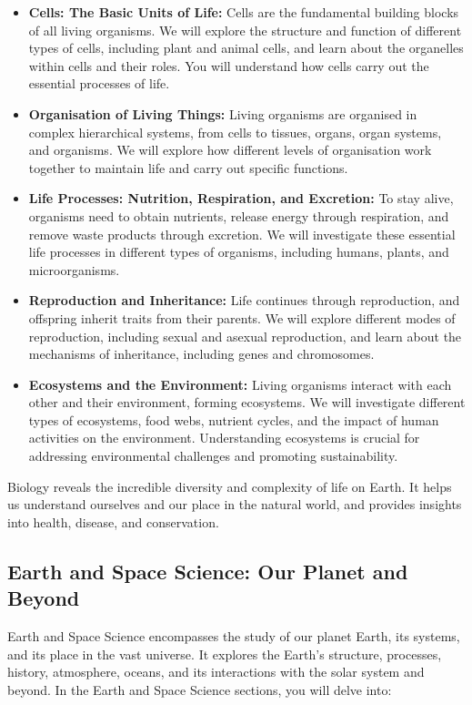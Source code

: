 \begin{itemize}
    \item \textbf{Cells: The Basic Units of Life:}  Cells are the fundamental building blocks of all living organisms.  We will explore the structure and function of different types of cells, including plant and animal cells, and learn about the organelles within cells and their roles.  You will understand how cells carry out the essential processes of life.
    \item \textbf{Organisation of Living Things:}  Living organisms are organised in complex hierarchical systems, from cells to tissues, organs, organ systems, and organisms.  We will explore how different levels of organisation work together to maintain life and carry out specific functions.
    \item \textbf{Life Processes: Nutrition, Respiration, and Excretion:}  To stay alive, organisms need to obtain nutrients, release energy through respiration, and remove waste products through excretion.  We will investigate these essential life processes in different types of organisms, including humans, plants, and microorganisms.
    \item \textbf{Reproduction and Inheritance:}  Life continues through reproduction, and offspring inherit traits from their parents.  We will explore different modes of reproduction, including sexual and asexual reproduction, and learn about the mechanisms of inheritance, including genes and chromosomes.
    \item \textbf{Ecosystems and the Environment:}  Living organisms interact with each other and their environment, forming ecosystems.  We will investigate different types of ecosystems, food webs, nutrient cycles, and the impact of human activities on the environment.  Understanding ecosystems is crucial for addressing environmental challenges and promoting sustainability.
\end{itemize}

Biology reveals the incredible diversity and complexity of life on Earth.  It helps us understand ourselves and our place in the natural world, and provides insights into health, disease, and conservation.

\FloatBarrier

\subsection{Earth and Space Science:  Our Planet and Beyond}

Earth and Space Science encompasses the study of our planet Earth, its systems, and its place in the vast universe.  It explores the Earth's structure, processes, history, atmosphere, oceans, and its interactions with the solar system and beyond.  In the Earth and Space Science sections, you will delve into:

